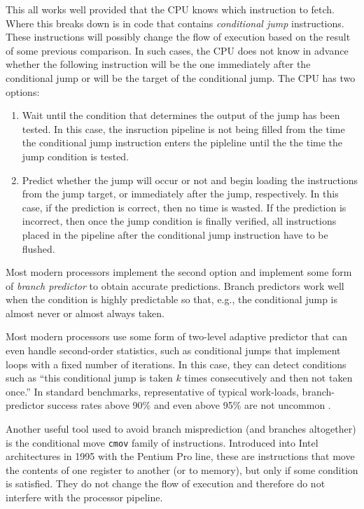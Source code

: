 \documentclass{patmorin}
\begin{document}
This all works well provided that the CPU knows which instruction to
fetch.  Where this breaks down is in code that contains \emph{conditional
jump} instructions. These instructions will possibly change the flow of
execution based on the result of some previous comparison.  In such cases,
the CPU does not know in advance whether the following instruction will
be the one immediately after the conditional jump or will be the target
of the conditional jump. The CPU has two options: 
\begin{enumerate}
  \item Wait until the condition that determines the output
   of the jump has been tested. In this case, the insruction pipeline
   is not being filled from the time the conditional jump instruction
   enters the pipleline until the the time the jump condition is tested.

  \item Predict whether the jump will occur or not and begin loading
  the instructions from the jump target, or immediately after the jump,
  respectively.  In this case, if the prediction is correct, then no
  time is wasted. If the prediction is incorrect, then once the jump
  condition is finally verified, all instructions placed in the pipeline
  after the conditional jump instruction have to be flushed.
\end{enumerate}

Most modern processors implement the second option and implement
some form of \emph{branch predictor} to obtain accurate predictions.
Branch predictors work well when the condition is highly predictable so
that, e.g., the conditional jump is almost never or almost always taken.

Most modern processors use some form of two-level adaptive predictor
\cite{yeh.patt.two-level} that can even handle second-order statistics,
such as conditional jumps that implement loops with a fixed number of
iterations. In this case, they can detect conditions such as ``this
conditional jump is taken $k$ times consecutively and then not taken
once.''  In standard benchmarks, representative of typical work-loads,
branch-predictor success rates above 90\% and even above 95\% are not
uncommon \cite{X}.

Another useful tool used to avoid branch misprediction (and branches
altogether) is the conditional move \texttt{cmov} family
of instructions.  Introduced into Intel architectures in 1995 with
the Pentium Pro line, these are instructions that move the contents of
one register to another (or to memory), but only if some condition is
satisfied. They do not change the flow of execution and therefore do
not interfere with the processor pipeline.
\end{document}
